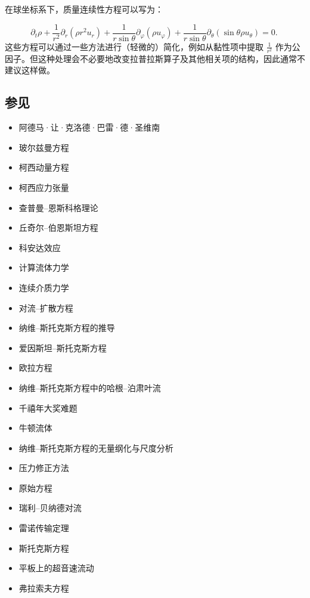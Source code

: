 在球坐标系下，质量连续性方程可以写为：

$$
\partial_t \rho
+ \frac{1}{r^2} \partial_r (\rho r^2 u_r)
+ \frac{1}{r \sin\theta} \partial_\varphi (\rho u_\varphi)
+ \frac{1}{r \sin\theta} \partial_\theta (\sin\theta \rho u_\theta)
= 0.~
$$
这些方程可以通过一些方法进行（轻微的）简化，例如从黏性项中提取 $\frac{1}{r^2}$ 作为公因子。但这种处理会不必要地改变拉普拉斯算子及其他相关项的结构，因此通常不建议这样做。
\subsection{参见}
\begin{itemize}
\item 阿德马·让·克洛德·巴雷·德·圣维南
\item 玻尔兹曼方程
\item 柯西动量方程
\item 柯西应力张量
\item 查普曼–恩斯科格理论
\item 丘奇尔–伯恩斯坦方程
\item 科安达效应
\item 计算流体力学
\item 连续介质力学
\item 对流–扩散方程
\item 纳维–斯托克斯方程的推导
\item 爱因斯坦–斯托克斯方程
\item 欧拉方程
\item 纳维–斯托克斯方程中的哈根–泊肃叶流
\item 千禧年大奖难题
\item 牛顿流体
\item 纳维–斯托克斯方程的无量纲化与尺度分析
\item 压力修正方法
\item 原始方程
\item 瑞利–贝纳德对流
\item 雷诺传输定理
\item 斯托克斯方程
\item 平板上的超音速流动
\item 弗拉索夫方程
\end{itemize}

